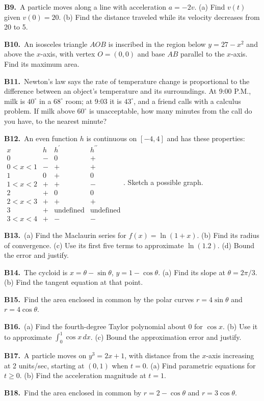 \documentclass[11pt]{article}
\begin{document}
\bigskip\noindent\textbf{B9.}\ A particle moves along a line with acceleration $a=-2v$. (a) Find $v(t)$ given $v(0)=20$. (b) Find the distance traveled while its velocity decreases from 20 to 5.

\bigskip\noindent\textbf{B10.}\ An isosceles triangle $AOB$ is inscribed in the region below $y=27-x^2$ and above the $x$-axis, with vertex $O=(0,0)$ and base $AB$ parallel to the $x$-axis. Find its maximum area.

\bigskip\noindent\textbf{B11.}\ Newton’s law says the rate of temperature change is proportional to the difference between an object’s temperature and its surroundings. At 9:00 P.M., milk is $40^\circ$ in a $68^\circ$ room; at 9:03 it is $43^\circ$, and a friend calls with a calculus problem. If milk above $60^\circ$ is unacceptable, how many minutes from the call do you have, to the nearest minute?

\bigskip\noindent\textbf{B12.}\ An even function $h$ is continuous on $[-4,4]$ and has these properties: $\begin{array}{c|ccc}x&h&h^{\prime}&h^{\prime\prime}\\0&-&0&+\\0<x<1&-&+&+\\1&0&+&0\\1<x<2&+&+&-\\2&+&0&0\\2<x<3&+&+&+\\3&+&\text{undefined}&\text{undefined}\\3<x<4&+&-&-\end{array}$. Sketch a possible graph.

\bigskip\noindent\textbf{B13.}\ (a) Find the Maclaurin series for $f(x)=\ln(1+x)$. (b) Find its radius of convergence. (c) Use its first five terms to approximate $\ln(1.2)$. (d) Bound the error and justify.

\bigskip\noindent\textbf{B14.}\ The cycloid is $x=\theta-\sin\theta$, $y=1-\cos\theta$. (a) Find its slope at $\theta=2\pi/3$. (b) Find the tangent equation at that point.

\bigskip\noindent\textbf{B15.}\ Find the area enclosed in common by the polar curves $r=4\sin\theta$ and $r=4\cos\theta$.

\bigskip\noindent\textbf{B16.}\ (a) Find the fourth-degree Taylor polynomial about 0 for $\cos x$. (b) Use it to approximate $\int_0^1\cos x\,dx$. (c) Bound the approximation error and justify.

\bigskip\noindent\textbf{B17.}\ A particle moves on $y^3=2x+1$, with distance from the $x$-axis increasing at 2 units/sec, starting at $(0,1)$ when $t=0$. (a) Find parametric equations for $t\ge0$. (b) Find the acceleration magnitude at $t=1$.

\bigskip\noindent\textbf{B18.}\ Find the area enclosed in common by $r=2-\cos\theta$ and $r=3\cos\theta$.
\end{document}
